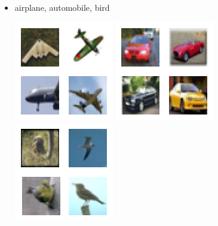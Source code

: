 \documentclass[a4paper,10pt]{article} %
\begin{document}
\begin{itemize}
	\item airplane, automobile, bird \\
	\begin{center} \includegraphics{imgs/class_0.png} \includegraphics{imgs/class_1.png} \includegraphics{imgs/class_2.png} \end{center}


\end{itemize}
\end{document}
